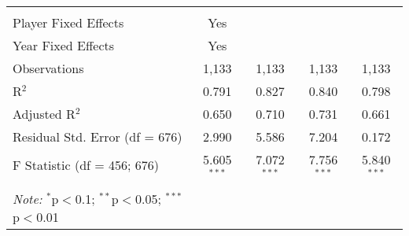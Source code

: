 \documentclass[a4paper,11pt]{article}
\begin{document}
\begin{table}[!htbp]
{\begin{tabular}{@{\extracolsep{5pt}}lcccc}
  & & & & \\ 
\hline \\[-1.8ex] 
Player Fixed Effects & Yes &  &  &  \\ 
Year Fixed Effects & Yes &  &  &  \\ 
Observations & 1,133 & 1,133 & 1,133 & 1,133 \\ 
R$^{2}$ & 0.791 & 0.827 & 0.840 & 0.798 \\ 
Adjusted R$^{2}$ & 0.650 & 0.710 & 0.731 & 0.661 \\ 
Residual Std. Error (df = 676) & 2.990 & 5.586 & 7.204 & 0.172 \\ 
F Statistic (df = 456; 676) & 5.605$^{***}$ & 7.072$^{***}$ & 7.756$^{***}$ & 5.840$^{***}$ \\ 
\hline 
\hline \\[-1.8ex] 
\textit{Note:} {$^{*}$p$<$0.1; $^{**}$p$<$0.05; $^{***}$p$<$0.01} \\ 
\end{tabular} }
\end{table} 
\end{document}
